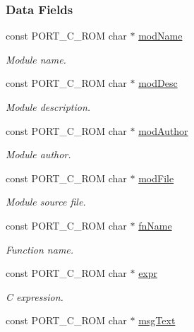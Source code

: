 \subsubsection*{Data Fields}
\begin{DoxyCompactItemize}
\item 
const P\-O\-R\-T\-\_\-\-C\-\_\-\-R\-O\-M char $\ast$ \hyperlink{structesDbgReport_a36408531293748b90f8dff6450221f8e}{mod\-Name}
\begin{DoxyCompactList}\small\item\em Module name. \end{DoxyCompactList}\item 
const P\-O\-R\-T\-\_\-\-C\-\_\-\-R\-O\-M char $\ast$ \hyperlink{structesDbgReport_af5eb0b7c0c3571227eebe18a1021c97c}{mod\-Desc}
\begin{DoxyCompactList}\small\item\em Module description. \end{DoxyCompactList}\item 
const P\-O\-R\-T\-\_\-\-C\-\_\-\-R\-O\-M char $\ast$ \hyperlink{structesDbgReport_a65c2230141505dd8ad88beed086c672e}{mod\-Author}
\begin{DoxyCompactList}\small\item\em Module author. \end{DoxyCompactList}\item 
const P\-O\-R\-T\-\_\-\-C\-\_\-\-R\-O\-M char $\ast$ \hyperlink{structesDbgReport_aee9f8437e9c8e1dd590e8cd217208643}{mod\-File}
\begin{DoxyCompactList}\small\item\em Module source file. \end{DoxyCompactList}\item 
const P\-O\-R\-T\-\_\-\-C\-\_\-\-R\-O\-M char $\ast$ \hyperlink{structesDbgReport_a447f326a4befb229f26182347613ade6}{fn\-Name}
\begin{DoxyCompactList}\small\item\em Function name. \end{DoxyCompactList}\item 
const P\-O\-R\-T\-\_\-\-C\-\_\-\-R\-O\-M char $\ast$ \hyperlink{structesDbgReport_ae672502f0fa16e09179393ea42b096bc}{expr}
\begin{DoxyCompactList}\small\item\em C expression. \end{DoxyCompactList}\item 
const P\-O\-R\-T\-\_\-\-C\-\_\-\-R\-O\-M char $\ast$ \hyperlink{structesDbgReport_a24a9b1bfc91e4dba26b8f8c2b0d9debb}{msg\-Text}

\end{DoxyCompactItemize}
